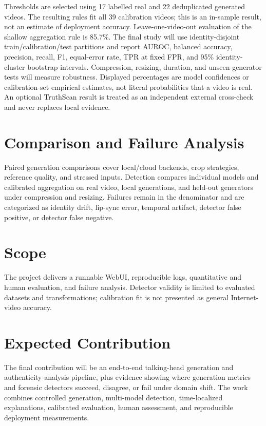 \documentclass[10pt,conference]{IEEEtran}
\begin{document}
Thresholds are selected using 17 labelled real and 22 deduplicated generated videos. The resulting rules fit all 39 calibration videos; this is an in-sample result, not an estimate of deployment accuracy. Leave-one-video-out evaluation of the shallow aggregation rule is 85.7\%. The final study will use identity-disjoint train/calibration/test partitions and report AUROC, balanced accuracy, precision, recall, F1, equal-error rate, TPR at fixed FPR, and 95\% identity-cluster bootstrap intervals. Compression, resizing, duration, and unseen-generator tests will measure robustness. Displayed percentages are model confidences or calibration-set empirical estimates, not literal probabilities that a video is real. An optional TruthScan result is treated as an independent external cross-check and never replaces local evidence.

\section{Comparison and Failure Analysis}
Paired generation comparisons cover local/cloud backends, crop strategies, reference quality, and stressed inputs. Detection compares individual models and calibrated aggregation on real video, local generations, and held-out generators under compression and resizing. Failures remain in the denominator and are categorized as identity drift, lip-sync error, temporal artifact, detector false positive, or detector false negative.

\section{Scope}
The project delivers a runnable WebUI, reproducible logs, quantitative and human evaluation, and failure analysis. Detector validity is limited to evaluated datasets and transformations; calibration fit is not presented as general Internet-video accuracy.

\section{Expected Contribution}
The final contribution will be an end-to-end talking-head generation and authenticity-analysis pipeline, plus evidence showing where generation metrics and forensic detectors succeed, disagree, or fail under domain shift. The work combines controlled generation, multi-model detection, time-localized explanations, calibrated evaluation, human assessment, and reproducible deployment measurements.
\end{document}
